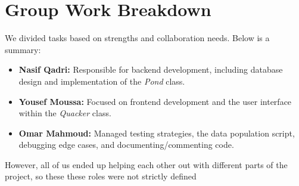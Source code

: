 \documentclass[11pt]{article}
\begin{document}
\section{Group Work Breakdown}
We divided tasks based on strengths and collaboration needs. Below is a summary:

\begin{itemize}
    \item \textbf{Nasif Qadri:} Responsible for backend development, including database design and implementation of the \textit{Pond} class.
    \item \textbf{Yousef Moussa:} Focused on frontend development and the user interface within the \textit{Quacker} class.
    \item \textbf{Omar Mahmoud:} Managed testing strategies, the data population script, debugging edge cases, and documenting/commenting code.
\end{itemize}

\noindent However, all of us ended up helping each other out with different parts of the project, so these these roles were not strictly defined 
\end{document}
